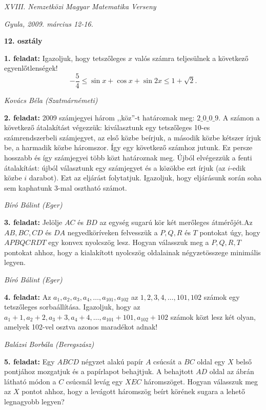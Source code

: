 \documentclass[a4paper,10pt]{article}
\def\ki#1#2{\hfill {\it #1 (#2)}\medskip}
\begin{document}
\begin{center} \Large {\em XVIII. Nemzetközi Magyar Matematika Verseny} \end{center}
\begin{center} \large{\em Gyula, 2009. március 12-16.} \end{center}
\smallskip
\begin{center} \large{\bf 12. osztály} \end{center}
\bigskip 

{\bf 1. feladat: }
Igazoljuk, hogy tetszőleges $x$ valós számra teljesülnek a következő
egyenlőtlenségek!
$$ -\frac 54\leq \sin{x}+\cos{x}+\sin{2x}\leq 1+\sqrt{2}. $$

\ki{Kovács Béla }{Szatmárnémeti}\medskip

{\bf 2. feladat: } 
2009 számjegyei három ,,köz''-t határoznak meg: $2\_0\_0\_9$.
A számon a következő átalakítást végezzük: kiválasztunk egy tetszőleges 10-es
számrendszerbeli számjegyet, az első közbe beírjuk, a második közbe kétszer írjuk be, a
harmadik közbe háromszor. Így egy következő számhoz jutunk. Ez persze hosszabb és így
számjegyei több közt határoznak meg. Újból elvégezzük a fenti átalakítást: újból választunk
egy számjegyet és a közökbe ezt írjuk (az $i$-edik közbe $i$ darabot). Ezt az eljárást folytatjuk.
Igazoljuk, hogy eljárásunk során soha sem kaphatunk 3-mal osztható számot.


\ki{Bíró Bálint }{Eger}\medskip

{\bf 3. feladat: } 
Jelölje $AC$ és $BD$ az egység sugarú kör két merőleges átmérőjét.Az $AB, BC,
CD$ és $DA$ negyedköríveken felvesszük a $P, Q, R$ és $T$ pontokat úgy, hogy $APBQCRDT$ egy
konvex nyolcszög lesz. Hogyan válasszuk meg a $P, Q, R, T$ pontokat ahhoz, hogy a kialakított
nyolcszög oldalainak négyzetösszege minimális legyen.

\ki{Bíró Bálint }{Eger}\medskip

{\bf 4. feladat: }
Az $a_1, a_2, a_3, a_4,\dots, a_{101}, a_{102}$ az $1, 2, 3, 4,\dots, 101, 102$ számok egy
tetszőleges sorbaállítása. Igazoljuk, hogy az $a_1+1, a_2+2, a_3+3, a_4+4,\dots, a_{101}+101, a_{102}+102$
számok közt lesz két olyan, amelyek 102-vel osztva azonos maradékot adnak!

\ki{Balázsi Borbála }{Beregszász}\medskip

{\bf 5. feladat: }
Egy $ABCD$ négyzet alakú papír $A$ csúcsát a $BC$ oldal egy $X$ belső pontjához
mozgatjuk és a papírlapot behajtjuk. A behajtott $AD$ oldal az ábrán látható módon a $C$
csúcsnál levág egy $XEC$ háromszöget. Hogyan válasszuk meg az $X$ pontot ahhoz, hogy a
levágott háromszög beírt körének sugara a lehető legnagyobb legyen?
\end{document}

